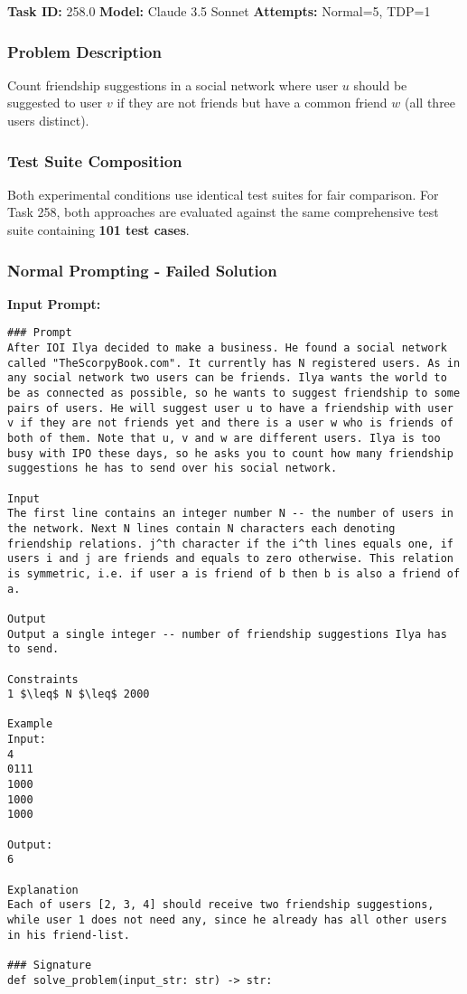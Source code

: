 \documentclass{article}
\begin{document}
\noindent \textbf{Task ID:} 258.0 \quad \textbf{Model:} Claude 3.5 Sonnet \quad \textbf{Attempts:} Normal=5, TDP=1

\subsubsection{Problem Description}
Count friendship suggestions in a social network where user $u$ should be suggested to user $v$ if they are not friends but have a common friend $w$ (all three users distinct).

\subsubsection{Test Suite Composition}
Both experimental conditions use identical test suites for fair comparison. For Task 258, both approaches are evaluated against the same comprehensive test suite containing \textbf{101 test cases}.

\subsubsection{Normal Prompting - Failed Solution}

\textbf{Input Prompt:}
\begin{lstlisting}
### Prompt
After IOI Ilya decided to make a business. He found a social network called "TheScorpyBook.com". It currently has N registered users. As in any social network two users can be friends. Ilya wants the world to be as connected as possible, so he wants to suggest friendship to some pairs of users. He will suggest user u to have a friendship with user v if they are not friends yet and there is a user w who is friends of both of them. Note that u, v and w are different users. Ilya is too busy with IPO these days, so he asks you to count how many friendship suggestions he has to send over his social network.

Input
The first line contains an integer number N -- the number of users in the network. Next N lines contain N characters each denoting friendship relations. j^th character if the i^th lines equals one, if users i and j are friends and equals to zero otherwise. This relation is symmetric, i.e. if user a is friend of b then b is also a friend of a.

Output
Output a single integer -- number of friendship suggestions Ilya has to send.

Constraints
1 $\leq$ N $\leq$ 2000

Example
Input:
4
0111
1000
1000
1000

Output:
6

Explanation
Each of users [2, 3, 4] should receive two friendship suggestions, while user 1 does not need any, since he already has all other users in his friend-list.

### Signature
def solve_problem(input_str: str) -> str:
\end{lstlisting}
\end{document}
